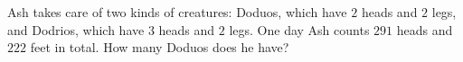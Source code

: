 Ash takes care of two kinds of creatures: Doduos, which have $2$ heads and $2$ legs, and Dodrios, which have $3$ heads and $2$ legs. One day Ash counts $291$ heads and $222$ feet in total. How many Doduos does he have?
